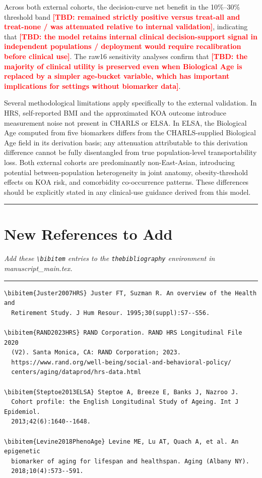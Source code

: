 \documentclass[11pt,a4paper]{article}
\newcommand{\TBD}[1]{\textcolor{red}{\textbf{[TBD: #1]}}}
\begin{document}
Across both external cohorts, the decision-curve net benefit in the 10\%--30\% threshold band \TBD{remained strictly positive versus treat-all and treat-none / was attenuated relative to internal validation}, indicating that \TBD{the model retains internal clinical decision-support signal in independent populations / deployment would require recalibration before clinical use}. The raw16 sensitivity analyses confirm that \TBD{the majority of clinical utility is preserved even when Biological Age is replaced by a simpler age-bucket variable, which has important implications for settings without biomarker data}.

Several methodological limitations apply specifically to the external validation. In HRS, self-reported BMI and the approximated KOA outcome introduce measurement noise not present in CHARLS or ELSA. In ELSA, the Biological Age computed from five biomarkers differs from the CHARLS-supplied Biological Age field in its derivation basis; any attenuation attributable to this derivation difference cannot be fully disentangled from true population-level transportability loss. Both external cohorts are predominantly non-East-Asian, introducing potential between-population heterogeneity in joint anatomy, obesity-threshold effects on KOA risk, and comorbidity co-occurrence patterns. These differences should be explicitly stated in any clinical-use guidance derived from this model.

\vspace{8pt}
\hrule

\section*{New References to Add}
\noindent\textit{Add these \texttt{\textbackslash bibitem} entries to the \texttt{thebibliography} environment in manuscript\_main.tex.}

\vspace{4pt}
\hrule
\vspace{8pt}

\begin{verbatim}
\bibitem{Juster2007HRS} Juster FT, Suzman R. An overview of the Health and
  Retirement Study. J Hum Resour. 1995;30(suppl):S7--S56.

\bibitem{RAND2023HRS} RAND Corporation. RAND HRS Longitudinal File 2020
  (V2). Santa Monica, CA: RAND Corporation; 2023.
  https://www.rand.org/well-being/social-and-behavioral-policy/
  centers/aging/dataprod/hrs-data.html

\bibitem{Steptoe2013ELSA} Steptoe A, Breeze E, Banks J, Nazroo J.
  Cohort profile: the English Longitudinal Study of Ageing. Int J Epidemiol.
  2013;42(6):1640--1648.

\bibitem{Levine2018PhenoAge} Levine ME, Lu AT, Quach A, et al. An epigenetic
  biomarker of aging for lifespan and healthspan. Aging (Albany NY).
  2018;10(4):573--591.
\end{verbatim}
\end{document}
